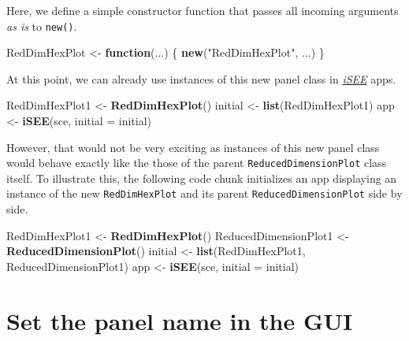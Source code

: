 \documentclass[]{book}
\newenvironment{Shaded}{\begin{snugshade}}{\end{snugshade}}
\newcommand{\KeywordTok}[1]{\textcolor[rgb]{0.13,0.29,0.53}{\textbf{#1}}}
\newcommand{\DataTypeTok}[1]{\textcolor[rgb]{0.13,0.29,0.53}{#1}}
\newcommand{\StringTok}[1]{\textcolor[rgb]{0.31,0.60,0.02}{#1}}
\newcommand{\ControlFlowTok}[1]{\textcolor[rgb]{0.13,0.29,0.53}{\textbf{#1}}}
\newcommand{\NormalTok}[1]{#1}
\begin{document}
Here, we define a simple constructor function that passes all incoming
arguments \emph{as is} to \texttt{new()}.

\begin{Shaded}
\begin{Highlighting}[]
\NormalTok{RedDimHexPlot <-}\StringTok{ }\ControlFlowTok{function}\NormalTok{(...) \{}
    \KeywordTok{new}\NormalTok{(}\StringTok{"RedDimHexPlot"}\NormalTok{, ...)}
\NormalTok{\}}
\end{Highlighting}
\end{Shaded}

At this point, we can already use instances of this new panel class in
\emph{\href{https://bioconductor.org/packages/3.11/iSEE}{iSEE}} apps.

\begin{Shaded}
\begin{Highlighting}[]
\NormalTok{RedDimHexPlot1 <-}\StringTok{ }\KeywordTok{RedDimHexPlot}\NormalTok{()}
\NormalTok{initial <-}\StringTok{ }\KeywordTok{list}\NormalTok{(RedDimHexPlot1)}
\NormalTok{app <-}\StringTok{ }\KeywordTok{iSEE}\NormalTok{(sce, }\DataTypeTok{initial =}\NormalTok{ initial)}
\end{Highlighting}
\end{Shaded}

However, that would not be very exciting as instances of this new panel
class would behave exactly like the those of the parent
\texttt{ReducedDimensionPlot} class itself. To illustrate this, the
following code chunk initializes an app displaying an instance of the
new \texttt{RedDimHexPlot} and its parent \texttt{ReducedDimensionPlot}
side by side.

\begin{Shaded}
\begin{Highlighting}[]
\NormalTok{RedDimHexPlot1 <-}\StringTok{ }\KeywordTok{RedDimHexPlot}\NormalTok{()}
\NormalTok{ReducedDimensionPlot1 <-}\StringTok{ }\KeywordTok{ReducedDimensionPlot}\NormalTok{()}
\NormalTok{initial <-}\StringTok{ }\KeywordTok{list}\NormalTok{(RedDimHexPlot1, ReducedDimensionPlot1)}
\NormalTok{app <-}\StringTok{ }\KeywordTok{iSEE}\NormalTok{(sce, }\DataTypeTok{initial =}\NormalTok{ initial)}
\end{Highlighting}
\end{Shaded}

\section{Set the panel name in the
GUI}\label{set-the-panel-name-in-the-gui}
\end{document}
